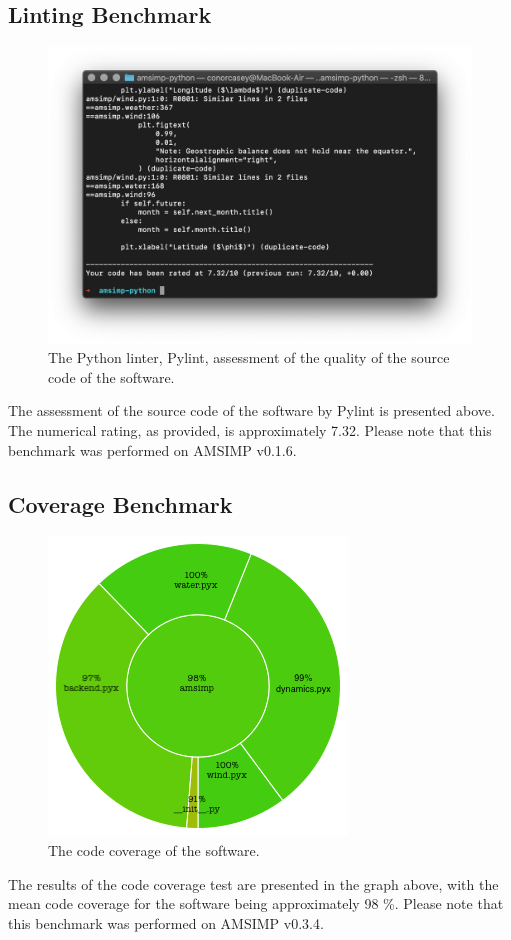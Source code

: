 \subsection{Linting Benchmark}
\begin{figure}[H]
    \centering
    \includegraphics[width=.7\linewidth]{Images/code_quality}
    \caption{The Python linter, Pylint, assessment of the quality of the source code of the software.}
    \label{code_quality}
\end{figure}

The assessment of the source code of the software by Pylint is presented above. The numerical rating, as provided, is approximately 7.32. Please note that this benchmark was performed on AMSIMP v0.1.6.

\subsection{Coverage Benchmark}
\begin{figure}[H]
    \centering
    \includegraphics[width=.4\linewidth]{Images/code_coverage.png}
    \caption{The code coverage of the software.}
    \label{code_coverage}
\end{figure}

The results of the code coverage test are presented in the graph above, with the mean code coverage for the software being approximately 98 \%. Please note that this benchmark was performed on AMSIMP v0.3.4. 
